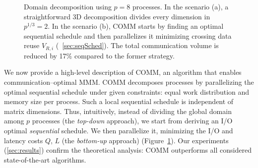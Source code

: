 \documentclass[sigplan,review,anonymous,10pt]{acmart}\settopmatter{printfolios=true,printccs=false,printacmref=false}
\begin{document}
\begin{figure}[!tbp]
	\centering
	\hfill
	\vspace{-1em}
	\caption{Domain decomposition
		using $p=8$  processes. In the scenario (a), a straightforward 3D 
		decomposition
		divides every dimension in $p^{1/3}=2$. In the scenario (b), COMM 
		starts by
		finding an optimal sequential schedule and then parallelizes it 
		minimizing
		crossing data reuse $V_{R,i}$ (~\cref{sec:seqSched}). The total 
		communication volume is reduced by 17\%
		compared to the former strategy.}
	\label{fig:topdown-vs-bottomup}
		\vspace{-1.5em}
\end{figure}

We now provide a high-level description of COMM, an algorithm that enables 
communication--optimal MMM.
COMM  decomposes processes by parallelizing the optimal sequential schedule
under given constraints: equal work distribution and memory size per process.
Such a local sequential schedule is independent of matrix dimensions.  Thus,
intuitively, instead of dividing  the global domain among $p$ processes (the
\emph{top-down} approach), we start from deriving an I/O optimal
\emph{sequential} schedule. We then parallelize it, minimizing the I/O and
latency costs $Q$, $L$ (the \emph{bottom-up} approach)
(Figure~\ref{fig:topdown-vs-bottomup}).
Our experiments 
(\cref{sec:results}) confirm the theoretical analysis: COMM outperforms
all considered state-of-the-art algorithms.
\end{document}
